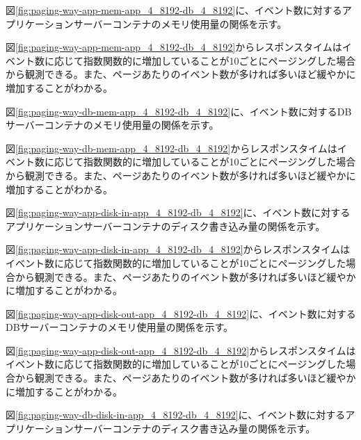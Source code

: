 \documentclass[../../../../main]{subfiles}
\begin{document}
    \label{subsubsubsec:result-paging-way-only-limit-mem}

    図\ref{fig:paging-way-app-mem-app_4_8192-db_4_8192}に、イベント数に対するアプリケーションサーバーコンテナのメモリ使用量の関係を示す。

    

    図\ref{fig:paging-way-app-mem-app_4_8192-db_4_8192}からレスポンスタイムはイベント数に応じて指数関数的に増加していることが10ごとにページングした場合から観測できる。また、ページあたりのイベント数が多ければ多いほど緩やかに増加することがわかる。

    図\ref{fig:paging-way-db-mem-app_4_8192-db_4_8192}に、イベント数に対するDBサーバーコンテナのメモリ使用量の関係を示す。

    

    図\ref{fig:paging-way-db-mem-app_4_8192-db_4_8192}からレスポンスタイムはイベント数に応じて指数関数的に増加していることが10ごとにページングした場合から観測できる。また、ページあたりのイベント数が多ければ多いほど緩やかに増加することがわかる。

    \label{subsubsubsec:result-paging-way-only-limit-disk-io}

    図\ref{fig:paging-way-app-disk-in-app_4_8192-db_4_8192}に、イベント数に対するアプリケーションサーバーコンテナのディスク書き込み量の関係を示す。

    

    図\ref{fig:paging-way-app-disk-in-app_4_8192-db_4_8192}からレスポンスタイムはイベント数に応じて指数関数的に増加していることが10ごとにページングした場合から観測できる。また、ページあたりのイベント数が多ければ多いほど緩やかに増加することがわかる。

    図\ref{fig:paging-way-app-disk-out-app_4_8192-db_4_8192}に、イベント数に対するDBサーバーコンテナのメモリ使用量の関係を示す。

    

    図\ref{fig:paging-way-app-disk-out-app_4_8192-db_4_8192}からレスポンスタイムはイベント数に応じて指数関数的に増加していることが10ごとにページングした場合から観測できる。また、ページあたりのイベント数が多ければ多いほど緩やかに増加することがわかる。

    図\ref{fig:paging-way-db-disk-in-app_4_8192-db_4_8192}に、イベント数に対するアプリケーションサーバーコンテナのディスク書き込み量の関係を示す。
\end{document}

